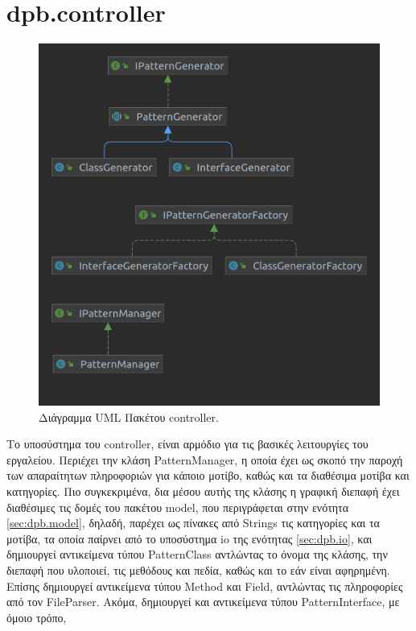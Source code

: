 \section{dpb.controller}
\label{sec:dpb.controller}
\begin{figure}[H]
    \centering
    \includegraphics[width=1.0\textwidth]{Figures/controller.png}
    \caption{Διάγραμμα UML Πακέτου controller.}
    \label{fig:controllerUML}
\end{figure}
Το υποσύστημα του controller, είναι αρμόδιο για τις βασικές λειτουργίες του εργαλείου. Περιέχει την κλάση PatternManager, 
η οποία έχει ως σκοπό την παροχή των απαραίτητων πληροφοριών για κάποιο μοτίβο, καθώς και τα διαθέσιμα μοτίβα και κατηγορίες. 
Πιο συγκεκριμένα, δια μέσου αυτής της κλάσης η γραφική διεπαφή έχει διαθέσιμες τις δομές του πακέτου model, που 
περιγράφεται στην ενότητα \ref{sec:dpb.model}, δηλαδή, παρέχει ως πίνακες από Strings τις κατηγορίες και τα μοτίβα, τα οποία παίρνει 
από το υποσύστημα io της ενότητας \ref{sec:dpb.io}, και δημιουργεί αντικείμενα τύπου PatternClass αντλώντας το όνομα της κλάσης, 
την διεπαφή που υλοποιεί, τις μεθόδους και πεδία, καθώς και το εάν είναι αφηρημένη. Επίσης δημιουργεί αντικείμενα τύπου Method και Field, 
αντλώντας τις πληροφορίες από τον FileParser. Ακόμα, δημιουργεί και αντικείμενα τύπου PatternInterface, με όμοιο τρόπο, 
